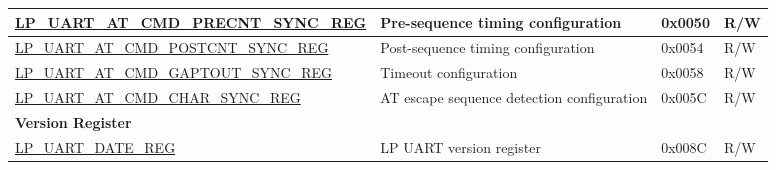 \begin{longtable}{ | p{6.6cm} | p{6.5cm} | p{1.3cm} | p{1.6cm} | }
\hyperref[regdesc:LPUARTATCMDPRECNTSYNCREG]{LP\_UART\_AT\_CMD\_PRECNT\_SYNC\_REG} & Pre-sequence timing configuration & 0x0050 & R/W \\ \hline
\hyperref[regdesc:LPUARTATCMDPOSTCNTSYNCREG]{LP\_UART\_AT\_CMD\_POSTCNT\_SYNC\_REG} & Post-sequence timing configuration & 0x0054 & R/W \\ \hline
\hyperref[regdesc:LPUARTATCMDGAPTOUTSYNCREG]{LP\_UART\_AT\_CMD\_GAPTOUT\_SYNC\_REG} & Timeout configuration & 0x0058 & R/W \\ \hline
\hyperref[regdesc:LPUARTATCMDCHARSYNCREG]{LP\_UART\_AT\_CMD\_CHAR\_SYNC\_REG} & AT escape sequence detection configuration & 0x005C & R/W \\ \hline
\multicolumn{4}{|l|}{\textbf{Version Register}} \\ \hline
\hyperref[regdesc:LPUARTDATEREG]{LP\_UART\_DATE\_REG} & LP UART version register & 0x008C & R/W \\ \hline

\end{longtable}
